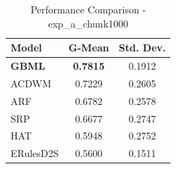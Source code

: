 \begin{table}[htbp]
\centering
\caption{Performance Comparison - exp_a_chunk1000}
\label{tab:performance_exp_a_chunk1000}
\begin{tabular}{lcc}
\toprule
Model & G-Mean & Std. Dev. \\
\midrule
\textbf{GBML} & \textbf{0.7815} & 0.1912 \\
ACDWM & 0.7229 & 0.2605 \\
ARF & 0.6782 & 0.2578 \\
SRP & 0.6677 & 0.2747 \\
HAT & 0.5948 & 0.2752 \\
ERulesD2S & 0.5600 & 0.1511 \\
\bottomrule
\end{tabular}
\end{table}